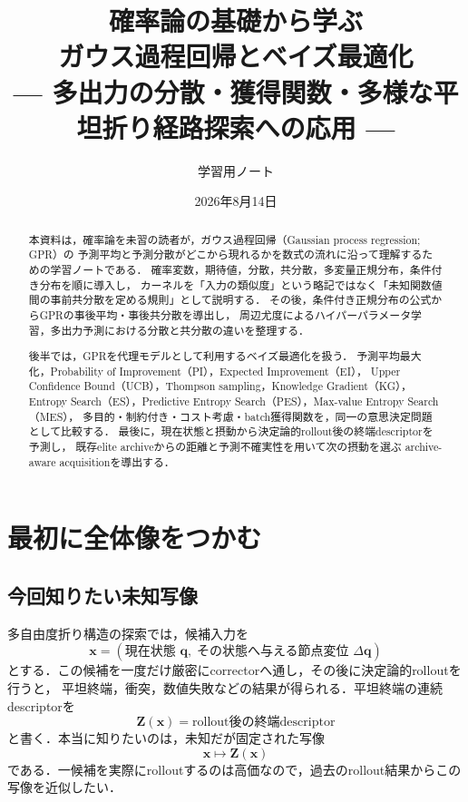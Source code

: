 \documentclass[a4paper,11pt]{ltjsarticle}
\title{確率論の基礎から学ぶ\\
ガウス過程回帰とベイズ最適化\\
\large --- 多出力の分散・獲得関数・多様な平坦折り経路探索への応用 ---}
\author{学習用ノート}
\date{2026年8月14日}
\begin{document}
\maketitle

\begin{abstract}
本資料は，確率論を未習の読者が，ガウス過程回帰（Gaussian process regression; GPR）の
予測平均と予測分散がどこから現れるかを数式の流れに沿って理解するための学習ノートである．
確率変数，期待値，分散，共分散，多変量正規分布，条件付き分布を順に導入し，
カーネルを「入力の類似度」という略記ではなく「未知関数値間の事前共分散を定める規則」として説明する．
その後，条件付き正規分布の公式からGPRの事後平均・事後共分散を導出し，
周辺尤度によるハイパーパラメータ学習，多出力予測における分散と共分散の違いを整理する．

後半では，GPRを代理モデルとして利用するベイズ最適化を扱う．
予測平均最大化，Probability of Improvement（PI），Expected Improvement（EI），
Upper Confidence Bound（UCB），Thompson sampling，Knowledge Gradient（KG），
Entropy Search（ES），Predictive Entropy Search（PES），Max-value Entropy Search（MES），
多目的・制約付き・コスト考慮・batch獲得関数を，同一の意思決定問題として比較する．
最後に，現在状態と摂動から決定論的rollout後の終端descriptorを予測し，
既存elite archiveからの距離と予測不確実性を用いて次の摂動を選ぶ
archive-aware acquisitionを導出する．
\end{abstract}

\begingroup
\small
\tableofcontents
\endgroup
\clearpage

\section{最初に全体像をつかむ}
\label{sec:overview}

\subsection{今回知りたい未知写像}

多自由度折り構造の探索では，候補入力を
\begin{equation}
  \bm x
  =
  (\text{現在状態 }\bm q,\;\text{その状態へ与える節点変位 }\Delta\bm q)
  \label{eq:application-input}
\end{equation}
とする．この候補を一度だけ厳密にcorrectorへ通し，その後に決定論的rolloutを行うと，
平坦終端，衝突，数値失敗などの結果が得られる．平坦終端の連続descriptorを
\begin{equation}
  \bm Z(\bm x)
  =\text{rollout後の終端descriptor}
  \label{eq:terminal-map}
\end{equation}
と書く．本当に知りたいのは，未知だが固定された写像
\begin{equation}
  \bm x\longmapsto\bm Z(\bm x)
\end{equation}
である．一候補を実際にrolloutするのは高価なので，過去のrollout結果からこの写像を近似したい．
\end{document}

